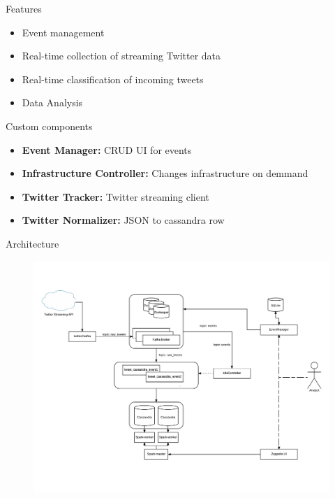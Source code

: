 \documentclass{beamer}
\begin{document}
\begin{frame}{Features}

\begin{itemize}
  \item Event management
  \item Real-time collection of streaming Twitter data
  \item Real-time classification of incoming tweets
  \item Data Analysis
\end{itemize}

\end{frame}

\begin{frame}{Custom components}

\begin{itemize}
  \item \textbf{Event Manager:} CRUD UI for events

  \item \textbf{Infrastructure Controller:} Changes infrastructure on demmand

  \item \textbf{Twitter Tracker:} Twitter streaming client

  \item \textbf{Twitter Normalizer:} JSON to cassandra row
\end{itemize}

\end{frame}

\begin{frame}{Architecture}

\begin{figure}
\colorbox{white}{\includegraphics[width=\textwidth]{Figures/SysArch}}
\end{figure}

\end{frame}
\end{document}
